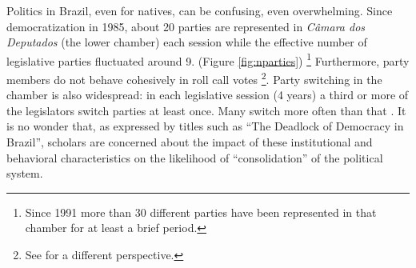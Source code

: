 \normalspace






Politics in Brazil, even for natives, can be confusing, even overwhelming. Since democratization in 1985, about 20 parties are represented in \emph{Câmara dos Deputados} (the lower chamber) each session while the effective number of legislative parties \citep{laakso:1979} fluctuated around 9. (Figure \ref{fig:nparties}) \footnote{Since 1991 more than 30 different parties have been represented in that chamber for at least a brief period.}  Furthermore, party members do not behave cohesively in roll call votes \citep{carey:2007,ames:2001}\footnote{See \citet{figueiredo:2000} for a different perspective.}. Party switching in the chamber is also widespread: in each legislative session (4 years)  a third or more of the legislators switch parties at least once. Many switch more often than that \citep{Desposato:2006}. It is no wonder that, as expressed by titles such as ``The Deadlock of Democracy in Brazil''\citep{ames:2001},  scholars are concerned about the impact of these institutional and behavioral characteristics on the likelihood of  ``consolidation'' of the political system.



